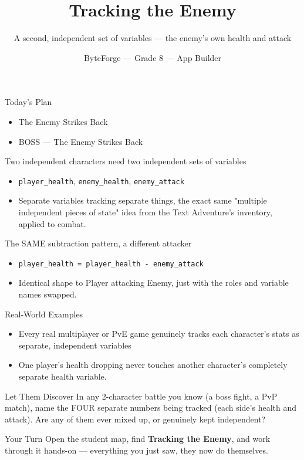 \documentclass[aspectratio=169]{beamer}
\title{Tracking the Enemy}
\subtitle{A second, independent set of variables — the enemy's own health and attack}
\author{ByteForge --- Grade 8 --- App Builder}
\date{}
\begin{document}
\begin{frame}
    \titlepage
\end{frame}

\begin{frame}{Today's Plan}
    \begin{itemize}
        \item The Enemy Strikes Back
        \item[$\bigstar$] BOSS --- The Enemy Strikes Back
    \end{itemize}
\end{frame}

\begin{frame}{Two independent characters need two independent sets of variables}
    \large
    \begin{itemize}
        \item \texttt{player\_health}, \texttt{enemy\_health}, \texttt{enemy\_attack}
        \item Separate variables tracking separate things, the exact same "multiple independent pieces of state" idea from the Text Adventure's inventory, applied to combat.
    \end{itemize}
\end{frame}


\begin{frame}{The SAME subtraction pattern, a different attacker}
    \large
    \begin{itemize}
        \item \texttt{player\_health = player\_health - enemy\_attack}
        \item Identical shape to Player attacking Enemy, just with the roles and variable names swapped.
    \end{itemize}
\end{frame}

\begin{frame}{Real-World Examples}
    \large
    \begin{itemize}
        \item Every real multiplayer or PvE game genuinely tracks each character's stats as separate, independent variables
        \item One player's health dropping never touches another character's completely separate health variable.
    \end{itemize}
\end{frame}


\begin{frame}{Let Them Discover}
    \Large
    In any 2-character battle you know (a boss fight, a PvP match), name the FOUR separate numbers being tracked (each side's health and attack). Are any of them ever mixed up, or genuinely kept independent?
\end{frame}

\begin{frame}{Your Turn}
    \Large
    Open the student map, find \textbf{Tracking the Enemy}, and work through it
    hands-on --- everything you just saw, they now do themselves.
\end{frame}
\end{document}

